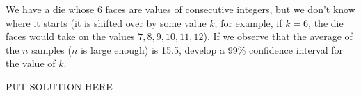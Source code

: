 \question We have a die whose 6 faces are values of consecutive integers, 
but we don’t know where it starts (it is shifted over by some value 
$k$; for example, if $k = 6$, the die faces would take on the values 
$7, 8, 9, 10, 11, 12$). If we observe that the average of the $n$ 
samples ($n$ is large enough) is 15.5, develop a 99\% confidence 
interval for the value of $k$.
\begin{solution}
PUT SOLUTION HERE
\end{solution}